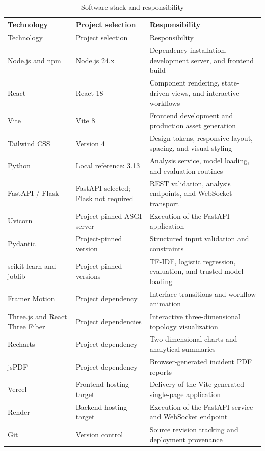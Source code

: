 \documentclass[12pt,a4paper,oneside]{report}
\begin{document}
\begin{longtable}{L{0.22\textwidth}L{0.25\textwidth}L{0.41\textwidth}}
\caption{Software stack and responsibility}\label{tab:software}\\
\toprule Technology & Project selection & Responsibility \\\midrule
\endfirsthead
\toprule Technology & Project selection & Responsibility \\\midrule
\endhead
Node.js and npm & Node.js 24.x & Dependency installation, development server, and frontend build \\
React & React 18 & Component rendering, state-driven views, and interactive workflows \\
Vite & Vite 8 & Frontend development and production asset generation \\
Tailwind CSS & Version 4 & Design tokens, responsive layout, spacing, and visual styling \\
Python & Local reference: 3.13 & Analysis service, model loading, and evaluation routines \\
FastAPI / Flask & FastAPI selected; Flask not required & REST validation, analysis endpoints, and WebSocket transport \\
Uvicorn & Project-pinned ASGI server & Execution of the FastAPI application \\
Pydantic & Project-pinned version & Structured input validation and constraints \\
scikit-learn and joblib & Project-pinned versions & TF-IDF, logistic regression, evaluation, and trusted model loading \\
Framer Motion & Project dependency & Interface transitions and workflow animation \\
Three.js and React Three Fiber & Project dependencies & Interactive three-dimensional topology visualization \\
Recharts & Project dependency & Two-dimensional charts and analytical summaries \\
jsPDF & Project dependency & Browser-generated incident PDF reports \\
Vercel & Frontend hosting target & Delivery of the Vite-generated single-page application \\
Render & Backend hosting target & Execution of the FastAPI service and WebSocket endpoint \\
Git & Version control & Source revision tracking and deployment provenance \\\bottomrule
\end{longtable}
\end{document}
